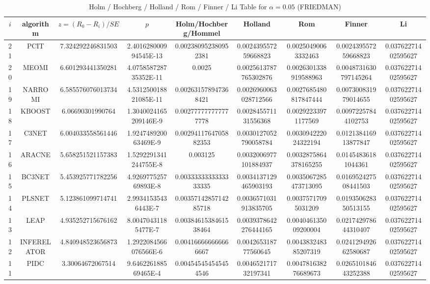 \documentclass[a4paper,10pt]{article}
\begin{document}
\begin{landscape}
\begin{table}[!htp]
\begin{tabular}{
|r|r|r|r|r|r|r|r|r|r|r|r|r|r|r|r|r|r|r|r|r|r|r|}
\end{tabular}
\end{table}

\newpage

\begin{table}[!htp]
\centering\scriptsize
\caption{Holm / Hochberg / Holland / Rom / Finner / Li Table for $\alpha=0.05$ (FRIEDMAN)}
\begin{tabular}{ccccccccc}
$i$&algorithm&$z=(R_0 - R_i)/SE$&$p$&Holm/Hochberg/Hommel&Holland&Rom&Finner&Li\\
\hline
21&PCIT&7.324292246831503&2.401628000994545E-13&0.002380952380952381&0.002439557259668823&0.00250490063332463&0.002439557259668823&0.03762271402595627\\
20&MEOMI&6.601293441350281&4.075858728735352E-11&0.0025&0.0025613787765302876&0.0026301338919588963&0.0048731630797145264&0.03762271402595627\\
19&NARROMI&6.585576076013734&4.531250018821085E-11&0.002631578947368421&0.0026960063028712566&0.0027685480817847444&0.007300831979014655&0.03762271402595627\\
18&KBOOST&6.06690301990764&1.3040024165209146E-9&0.002777777777777778&0.002845571131556368&0.00292233971177569&0.00972257844102753&0.03762271402595627\\
17&C3NET&6.004033558561446&1.924748920063469E-9&0.0029411764705882353&0.0030127052790058784&0.003094222024322194&0.012138416913877847&0.03762271402595627\\
16&ARACNE&5.658251521157383&1.5292291341244755E-8&0.003125&0.0032006977101884937&0.0032875864378165255&0.01454836181044361&0.03762271402595627\\
15&BC3NET&5.453925771782256&4.926977525769893E-8&0.0033333333333333335&0.0034137129465903193&0.0035067285473713095&0.016952427508441503&0.03762271402595627\\
14&PLSNET&5.123861099714741&2.99341535436443E-7&0.0035714285714285718&0.0036571031913835705&0.00375717095031209&0.019350628350513155&0.03762271402595627\\
13&LEAP&4.935252715676162&8.00470431185477E-7&0.0038461538461538464&0.0039378642276444165&0.004046135009200004&0.021742978644310407&0.03762271402595627\\
12&INFERELATOR&4.840948523656873&1.2922084566076566E-6&0.004166666666666667&0.004265318777560645&0.004383248385207319&0.024129492662580687&0.03762271402595627\\
11&PIDC&3.30064672067514&9.646226188569465E-4&0.004545454545454546&0.004652171732197341&0.004781638276689673&0.026510184643252388&0.03762271402595627\\

\end{tabular}
\end{table}
\end{landscape}
\end{document}
